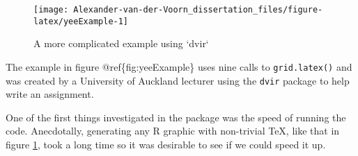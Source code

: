 \documentclass[]{article}
\newenvironment{Shaded}{\begin{snugshade}}{\end{snugshade}}
\newcommand{\KeywordTok}[1]{\textcolor[rgb]{0.13,0.29,0.53}{\textbf{#1}}}
\newcommand{\DataTypeTok}[1]{\textcolor[rgb]{0.13,0.29,0.53}{#1}}
\newcommand{\FloatTok}[1]{\textcolor[rgb]{0.00,0.00,0.81}{#1}}
\newcommand{\CharTok}[1]{\textcolor[rgb]{0.31,0.60,0.02}{#1}}
\newcommand{\StringTok}[1]{\textcolor[rgb]{0.31,0.60,0.02}{#1}}
\newcommand{\NormalTok}[1]{#1}
\begin{document}
\begin{Shaded}
\end{Shaded}

\begin{figure}

{\centering \texttt{[image: Alexander-van-der-Voorn\_dissertation\_files/figure-latex/yeeExample-1]} 

}

\caption{A more complicated example using `dvir`}\label{fig:yeeExample}
\end{figure}

The example in figure @ref\{fig:yeeExample\} uses nine calls to
\texttt{grid.latex()} and was created by a University of Auckland
lecturer using the \texttt{dvir} package to help write an assignment.

One of the first things investigated in the package was the speed of
running the code. Anecdotally, generating any R graphic with non-trivial
\TeX{}, like that in figure \ref{fig:yeeExample}, took a long time so it
was desirable to see if we could speed it up.
\end{document}
